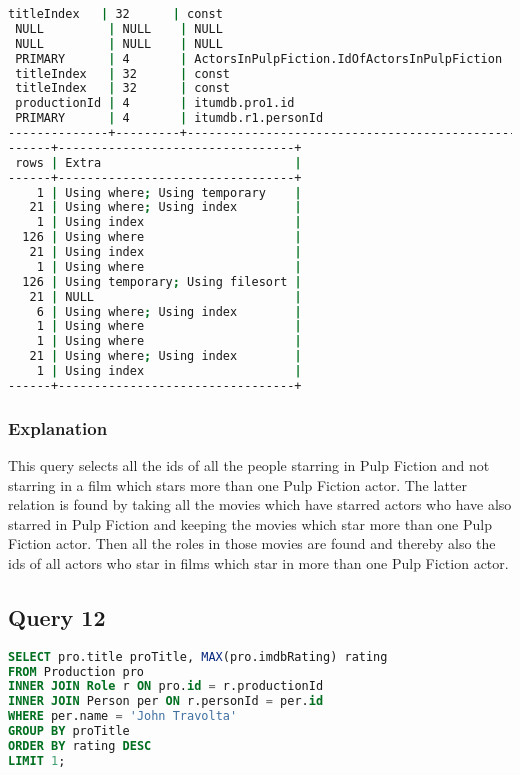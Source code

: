 \begin{lstlisting}[language=bash]
 titleIndex   | 32      | const                                              |
 NULL         | NULL    | NULL                                               |
 NULL         | NULL    | NULL                                               |
 PRIMARY      | 4       | ActorsInPulpFiction.IdOfActorsInPulpFiction        |
 titleIndex   | 32      | const                                              |
 titleIndex   | 32      | const                                              |
 productionId | 4       | itumdb.pro1.id                                     |
 PRIMARY      | 4       | itumdb.r1.personId                                 |
--------------+---------+----------------------------------------------------+
------+---------------------------------+
 rows | Extra                           |
------+---------------------------------+
    1 | Using where; Using temporary    |
   21 | Using where; Using index        |
    1 | Using index                     |
  126 | Using where                     |
   21 | Using index                     |
    1 | Using where                     |
  126 | Using temporary; Using filesort |
   21 | NULL                            |
    6 | Using where; Using index        |
    1 | Using where                     |
    1 | Using where                     |
   21 | Using where; Using index        |
    1 | Using index                     |
------+---------------------------------+

\end{lstlisting}

\subsubsection{Explanation}
This query selects all the ids of all the people starring in Pulp Fiction and not starring in a film which stars more than one Pulp Fiction actor. The latter relation is found by taking all the movies which have starred actors who have also starred in Pulp Fiction and keeping the movies which star more than one Pulp Fiction actor. Then all the roles in those movies are found and thereby also the ids of all actors who star in films which star in more than one Pulp Fiction actor.


\subsection{Query 12}
\begin{lstlisting}[language=sql]
SELECT pro.title proTitle, MAX(pro.imdbRating) rating
FROM Production pro
INNER JOIN Role r ON pro.id = r.productionId
INNER JOIN Person per ON r.personId = per.id
WHERE per.name = 'John Travolta'
GROUP BY proTitle
ORDER BY rating DESC
LIMIT 1;
\end{lstlisting}

